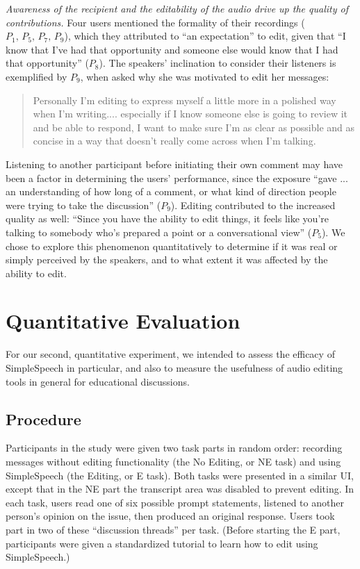 \emph{Awareness of the recipient and the editability of the audio drive up the quality of contributions.}
Four users mentioned the formality of their recordings ($P_1,\,P_5,\,P_7,\,P_9$), which they attributed to ``an expectation'' to edit, given that ``I know that I've had that opportunity and someone else would know that I had that opportunity'' ($P_8$).
The speakers' inclination to consider their listeners is exemplified by $P_9$, when asked why she was motivated to edit her messages:
\begin{quote}
	Personally I'm editing to express myself a little more in a polished way when I'm writing.... especially if I know someone else is going to review it and be able to respond, I want to make sure I'm as clear as possible and as concise in a way that doesn't really come across when I'm talking.
\end{quote}
Listening to another participant before initiating their own comment may have been a factor in determining the users' performance, since the exposure ``gave ... an understanding of how long of a comment, or what kind of direction people were trying to take the discussion'' ($P_9$). 
Editing contributed to the increased quality as well: ``Since you have the ability to edit things, it feels like you're talking to somebody who's prepared a point or a conversational view'' ($P_5$). 
We chose to explore this phenomenon quantitatively to determine if it was real or simply perceived by the speakers, and to what extent it was affected by the ability to edit.

\section{Quantitative Evaluation}
For our second, quantitative experiment, we intended to assess the efficacy of SimpleSpeech in particular, and also to measure the usefulness of audio editing tools in general for educational discussions.

\subsection{Procedure}
Participants in the study were given two task parts in random order: recording messages without editing functionality (the No Editing, or NE task) and using SimpleSpeech (the Editing, or E task). 
Both tasks were presented in a similar UI, except that in the NE part the transcript area was disabled to prevent editing.
In each task, users read one of six possible prompt statements, listened to another person's opinion on the issue, then produced an original response.
Users took part in two of these ``discussion threads'' per task.
(Before starting the E part, participants were given a standardized tutorial to learn how to edit using SimpleSpeech.)

